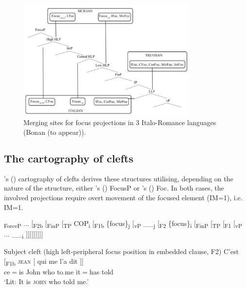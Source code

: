 \documentclass[fleqn,10pt]{wlscirep}
\begin{document}
\begin{figure}[h!]
    \centering
    \includegraphics[width=90mm]{images/focus.png}
    \caption{Merging sites for focus projections in 3 Italo-Romance languages (Bonan (to appear)).}
    \label{fig:focus}
  \end{figure}

\subsection*{The cartography of clefts}

\citeauthor{belletti2015}’s (\citeyear{belletti2015}) cartography of clefts derives these structures utilising, depending on the nature of the structure, either \citeauthor{rizzi1997fine}’s (\citeyear{rizzi1997fine}) FocusP or \citeauthor{belletti2004}’s (\citeyear{belletti2004}) Foc. 
In both cases, the involved projections require overt movement of the focused element (IM=1), i.e. IM=1.

\begin{exe}
    \ex {[}\textsubscript{ForceP} ... {[}\textsubscript{F2b} {[}\textsubscript{FinP} {[}\textsubscript{TP} COP\textsubscript{i} {[}\textsubscript{F1b} \{focus\}\textsubscript{j} {[}\textsubscript{vP} \_\_\textsubscript{j} {[}\textsubscript{F2} \{focus\}\textsubscript{i} {[}\textsubscript{FinP} {[}\textsubscript{TP} {[}\textsubscript{F1} {[}\textsubscript{vP} ... \_\_\textsubscript{i} {]]]]]]]]]}
\end{exe}

\begin{exe}
    \ex	Subject cleft (high left-peripheral focus position in embedded clause, F2)
        \gll {[} C'est {[}\textsubscript{F1b} \textsc{jean} {[} qui me l'a dit {]]}\\
        {} ce$=$is  {}		John	{}	who to.me it$=$has told {}\\
        \vspace*{-3mm}
        \glt ‘Lit: It is \textsc{john} who told me.’
\end{exe}
\end{document}
